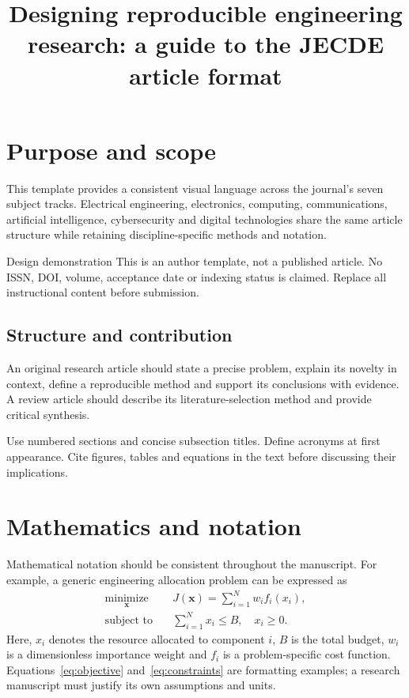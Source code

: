 \documentclass{jecde}
\title{Designing reproducible engineering research: a guide to the JECDE article format}
\begin{document}
\maketitle
\section{Purpose and scope}
This template provides a consistent visual language across the journal's seven subject tracks. Electrical engineering, electronics, computing, communications, artificial intelligence, cybersecurity and digital technologies share the same article structure while retaining discipline-specific methods and notation.



\begin{jecnote}{Design demonstration}
This is an author template, not a published article. No ISSN, DOI, volume, acceptance date or indexing status is claimed. Replace all instructional content before submission.
\end{jecnote}

\subsection{Structure and contribution}
An original research article should state a precise problem, explain its novelty in context, define a reproducible method and support its conclusions with evidence. A review article should describe its literature-selection method and provide critical synthesis.

Use numbered sections and concise subsection titles. Define acronyms at first appearance. Cite figures, tables and equations in the text before discussing their implications.

\section{Mathematics and notation}
Mathematical notation should be consistent throughout the manuscript. For example, a generic engineering allocation problem can be expressed as
\begin{align}
\underset{\boldsymbol{x}}{\operatorname{minimize}}\quad &J(\boldsymbol{x})=\sum_{i=1}^{N}w_i f_i(x_i),\label{eq:objective}\\
\text{subject to}\quad &\sum_{i=1}^{N}x_i\leq B,\quad x_i\geq0.\label{eq:constraints}
\end{align}
Here, $x_i$ denotes the resource allocated to component $i$, $B$ is the total budget, $w_i$ is a dimensionless importance weight and $f_i$ is a problem-specific cost function. Equations~\eqref{eq:objective} and~\eqref{eq:constraints} are formatting examples; a research manuscript must justify its own assumptions and units.
\end{document}
